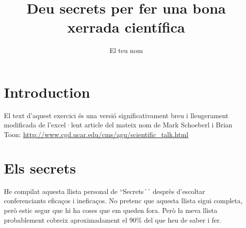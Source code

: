 \documentclass[12pt]{article}
\title{Deu secrets per fer una bona xerrada científica}
\author{El teu nom}
\begin{document}
\maketitle

\section{Introduction}

El text d'aquest exercici és una versió significativament breu i lleugerament modificada de l'excel·lent article del mateix nom de Mark Schoeberl i Brian Toon:
\url {http://www.cgd.ucar.edu/cms/agu/scientific_talk.html}

\section{Els secrets}

He compilat aquesta llista personal de ``Secrets´´ desprès d'escoltar conferenciants eficaços i ineficaços. No pretenc que aquesta llista sigui completa, però estic segur que hi ha coses que em queden fora. Però la meva llista probablement cobreix aproximadament el 90\% del que heu de saber i fer.
\end{document}
